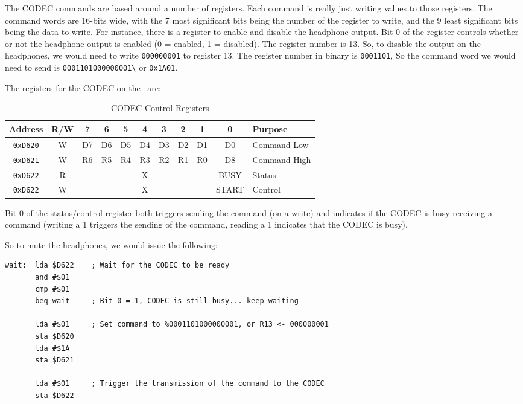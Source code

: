 The CODEC commands are based around a number of registers. Each command is really just writing values to those registers. The command words are 16-bits wide, with the 7 most significant bits being the number of the register to write, and the 9 least significant bits being the data to write. For instance, there is a register to enable and disable the headphone output. Bit 0 of the register controls whether or not the headphone output is enabled (0 = enabled, 1 = disabled). The register number is 13. So, to disable the output on the headphones, we would need to write \verb+000000001+ to register 13. The register number in binary is \verb+0001101+, So the command word we would need to send is \verb+0001101000000001\+ or \verb+0x1A01+.

The registers for the CODEC on the \jr\ are:

\begin{table}[h]
	\begin{center}
		\begin{tabular}{|c|c|c|c|c|c|c|c|c|c|l|} \hline
			Address & R/W & 7 & 6 & 5 & 4 & 3 & 2 & 1 & 0 & Purpose \\ \hline \hline
			\verb+0xD620+ & W & D7 & D6 & D5 & D4 & D3 & D2 & D1 & D0 & Command Low \\ \hline
			\verb+0xD621+ & W & R6 & R5 & R4 & R3 & R2 & R1 & R0 & D8 & Command High \\ \hline
			\verb+0xD622+ & R & \multicolumn{7}{|c|}{X} & BUSY & Status \\ \hline
			\verb+0xD622+ & W & \multicolumn{7}{|c|}{X} & START & Control \\ \hline
		\end{tabular}
		\caption{CODEC Control Registers}
	\end{center}
	\label{tab:codec_registers}
\end{table}

Bit 0 of the status/control register both triggers sending the command (on a write) and indicates if the CODEC is busy receiving a command (writing a 1 triggers the sending of the command, reading a 1 indicates that the CODEC is busy).

So to mute the headphones, we would issue the following:

\begin{verbatim}
wait:  lda $D622    ; Wait for the CODEC to be ready
       and #$01
	   cmp #$01
       beq wait 	; Bit 0 = 1, CODEC is still busy... keep waiting

	   lda #$01		; Set command to %0001101000000001, or R13 <- 000000001
	   sta $D620
	   lda #$1A
	   sta $D621

	   lda #$01		; Trigger the transmission of the command to the CODEC
	   sta $D622
\end{verbatim}

